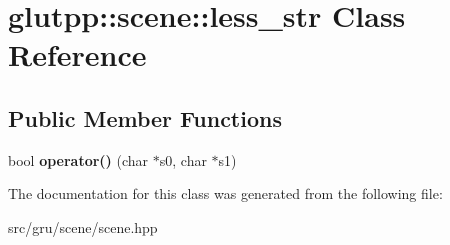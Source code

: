 \hypertarget{classglutpp_1_1scene_1_1less__str}{\section{glutpp\-:\-:scene\-:\-:less\-\_\-str \-Class \-Reference}
\label{classglutpp_1_1scene_1_1less__str}
}
\subsection*{\-Public \-Member \-Functions}
\begin{DoxyCompactItemize}
\item 
\hypertarget{classglutpp_1_1scene_1_1less__str_a97a65e59ef7013f1b590495605d74c36}{bool {\bfseries operator()} (char $\ast$s0, char $\ast$s1)}\label{classglutpp_1_1scene_1_1less__str_a97a65e59ef7013f1b590495605d74c36}

\end{DoxyCompactItemize}


\-The documentation for this class was generated from the following file\-:\begin{DoxyCompactItemize}
\item 
src/gru/scene/scene.\-hpp\end{DoxyCompactItemize}
